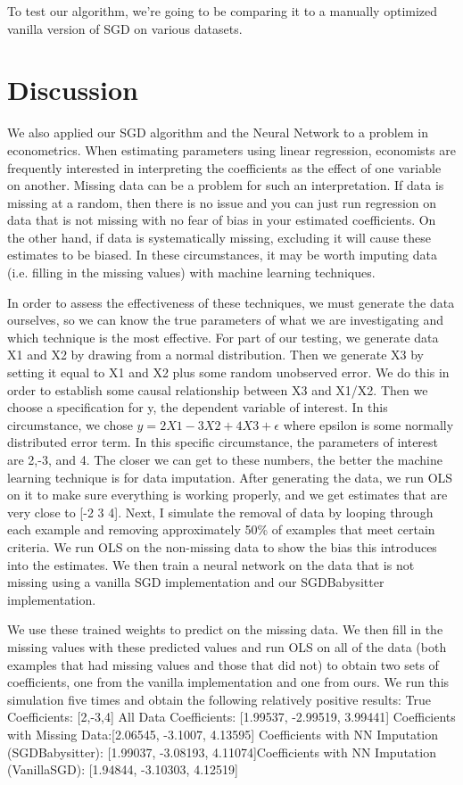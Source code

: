 \documentclass{article}
\begin{document}
To test our algorithm, we're going to be comparing it to a manually optimized vanilla version of SGD on various datasets. 

\section*{Discussion}
We also applied our SGD algorithm and the Neural Network to a problem in econometrics. When estimating parameters using linear regression, economists are frequently interested in interpreting the coefficients as the effect of one variable on another. Missing data can be a problem for such an interpretation. If data is missing at a random, then there is no issue and you can just run regression on data that is not missing with no fear of bias in your estimated coefficients. On the other hand, if data is systematically missing, excluding it will cause these estimates to be biased.  In these circumstances, it may be worth imputing data (i.e. filling in the missing values) with machine learning techniques. 
\par In order to assess the effectiveness of these techniques, we must generate the data ourselves, so we can know the true parameters of what we are investigating and which technique is the most effective. 
For part of our testing, we generate data X1 and X2 by drawing from a normal distribution. Then we generate X3 by setting it equal to X1 and X2 plus some random unobserved error. We do this in order to establish some causal relationship between X3 and X1/X2.  Then we choose a specification for y, the dependent variable of interest. In this circumstance, we chose $y=2X1-3X2+4X3 +\epsilon$ where epsilon is some normally distributed error term.  In this specific circumstance, the parameters of interest are 2,-3, and 4. The closer we can get to these numbers, the better the machine learning technique is for data imputation. 
After generating the data, we run OLS on it to make sure everything is working properly, and we get estimates that are very close to [-2 3 4]. Next, I simulate the removal of data by looping through each example and removing approximately 50\% of examples that meet certain criteria.   We run OLS on the non-missing data to show the bias this introduces into the estimates. We then train a neural network on the data that is not missing using a vanilla SGD implementation and our SGDBabysitter implementation.  
\par We use these trained weights to predict on the missing data. We then fill in the missing values with these predicted values and run OLS on all of the data (both examples that had missing values and those that did not) to obtain two sets of coefficients, one from the vanilla implementation and one from ours.  We run this simulation five times and obtain the following relatively positive results:
True Coefficients: [2,-3,4] \newline
All Data Coefficients: [1.99537, -2.99519, 3.99441] \newline
Coefficients with Missing Data:[2.06545, -3.1007, 4.13595] \newline
Coefficients with NN Imputation (SGDBabysitter): [1.99037, -3.08193, 4.11074]\newline Coefficients with NN Imputation (VanillaSGD): [1.94844, -3.10303, 4.12519]
\end{document}
